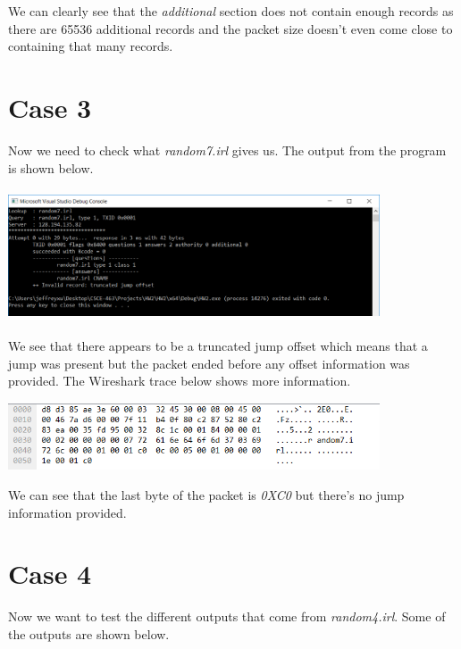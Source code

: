 \documentclass[12pt]{article}
\begin{document}
We can clearly see that the \emph{additional} section does not contain enough records as there are 65536 additional records and the packet size doesn't even come close to containing that many records. 

\section{Case 3}

Now we need to check what \emph{random7.irl} gives us. The output from the program is shown below. 

\begin{center}
\includegraphics[width=11cm, height=3.9cm]{random7.irl}
\end{center}

We see that there appears to be a truncated jump offset which means that a jump was present but the packet ended before any offset information was provided. The Wireshark trace below shows more information. 

\begin{center}
\includegraphics[width=11cm, height=2cm]{random7.irlWireShark}
\end{center}

We can see that the last byte of the packet is \emph{0XC0} but there's no jump information provided. 

\section{Case 4}

Now we want to test the different outputs that come from \emph{random4.irl}. Some of the outputs are shown below. 
\end{document}
